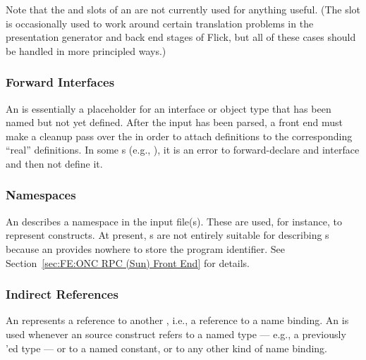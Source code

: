 Note that the  and  slots of an  are
not currently used for anything useful.  (The  slot is occasionally
used to work around certain translation problems in the presentation generator
and back end stages of Flick, but all of these cases should be handled in more
principled ways.)


\subsubsection{Forward Interfaces}

An  is essentially a placeholder for an interface or object
type that has been named but not yet defined.  After the input \IDL{} has been
parsed, a front end must make a cleanup pass over the \AOI{} in order to attach
 definitions to the corresponding ``real''
 definitions.  In some \IDL{}s (e.g., \CORBA{} \IDL{}), it
is an error to forward-declare and interface and then not define it.


\subsubsection{Namespaces}

An  describes a namespace in the input \IDL{} file(s).
These are used, for instance, to represent \CORBA{}  constructs.
At present, s are not entirely suitable for describing
\ONCRPC{} s because an  provides nowhere to
store the program identifier.  See Section~\ref{sec:FE:ONC RPC (Sun) Front End}
for details.


\subsubsection{Indirect References}

An  represents a reference to another , i.e., a
reference to a name binding.  An  is used whenever an \IDL{}
source construct refers to a named type --- e.g., a previously 'ed
type --- or to a named constant, or to any other kind of name binding.

